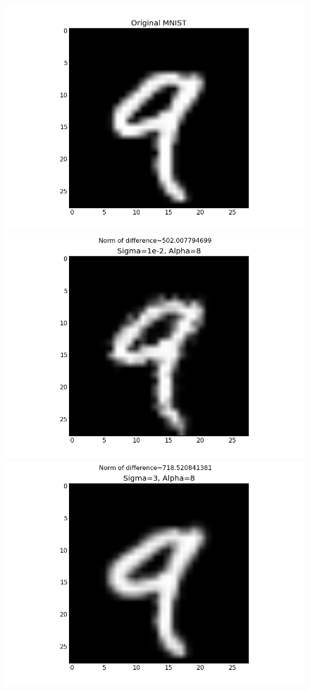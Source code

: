 \documentclass[conference]{IEEEtran}
\begin{document}
\begin{figure}[h]
	\centering
	\includegraphics[scale=0.30]{OriginalMNIST.png}
	\includegraphics[scale=0.30]{Sigma=1e-2,Alpha=8.png}
	\includegraphics[scale=0.30]{Sigma=3,Alpha=8.png}

\end{figure}
\end{document}
